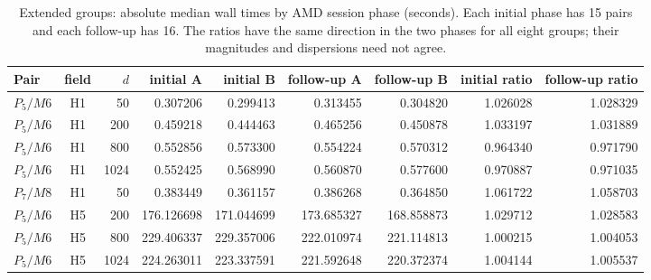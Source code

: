 \begin{table}[htbp]
\centering\scriptsize
\setlength{\tabcolsep}{3pt}
\caption{Extended groups: absolute median wall times by AMD session phase (seconds). Each initial phase has 15 pairs and each follow-up has 16. The ratios have the same direction in the two phases for all eight groups; their magnitudes and dispersions need not agree.}\label{tab:ext-phases}
\begin{tabular}{lcrrrrrrr}\toprule
Pair & field & $d$ & initial A & initial B & follow-up A & follow-up B & initial ratio & follow-up ratio\\\midrule
$P_{5}/M6$ & H1 & 50 & 0.307206 & 0.299413 & 0.313455 & 0.304820 & 1.026028 & 1.028329\\
$P_{5}/M6$ & H1 & 200 & 0.459218 & 0.444463 & 0.465256 & 0.450878 & 1.033197 & 1.031889\\
$P_{5}/M6$ & H1 & 800 & 0.552856 & 0.573300 & 0.554224 & 0.570312 & 0.964340 & 0.971790\\
$P_{5}/M6$ & H1 & 1024 & 0.552425 & 0.568990 & 0.560870 & 0.577600 & 0.970887 & 0.971035\\
$P_{7}/M8$ & H1 & 50 & 0.383449 & 0.361157 & 0.386268 & 0.364850 & 1.061722 & 1.058703\\
$P_{5}/M6$ & H5 & 200 & 176.126698 & 171.044699 & 173.685327 & 168.858873 & 1.029712 & 1.028583\\
$P_{5}/M6$ & H5 & 800 & 229.406337 & 229.357006 & 222.010974 & 221.114813 & 1.000215 & 1.004053\\
$P_{5}/M6$ & H5 & 1024 & 224.263011 & 223.337591 & 221.592648 & 220.372374 & 1.004144 & 1.005537\\
\bottomrule\end{tabular}
\end{table}
\FloatBarrier
